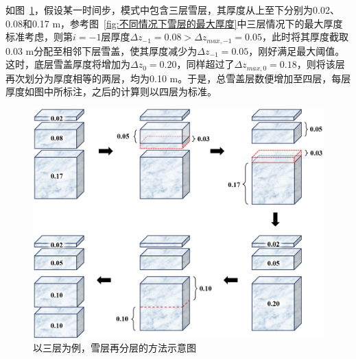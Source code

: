 如图~\ref{fig:以三层为例雪层再分层的方法}，假设某一时间步，模式中包含三层雪层，其厚度从上至下分别为0.02、0.08和0.17 m，参考图~\ref{fig:不同情况下雪层的最大厚度}中三层情况下的最大厚度标准考虑，则第$i=-1$层厚度$\Delta z_{-1}=0.08 > \Delta z_{max,-1}=0.05 $，此时将其厚度截取0.03 m分配至相邻下层雪盖，使其厚度减少为$\Delta z_{-1}=0.05$，刚好满足最大阈值。这时，底层雪盖厚度将增加为$\Delta z_{0}=0.20$，同样超过了$\Delta z_{max,0}=0.18$，则将该层再次划分为厚度相等的两层，均为0.10 m。于是，总雪盖层数便增加至四层，每层厚度如图中所标注，之后的计算则以四层为标准。

{
\begin{figure}[htbp]
\centering
\includegraphics[width=0.6\columnwidth]{Figures/雪盖土壤热力过程/以三层为例雪层再分层的方法.png}
\caption{以三层为例，雪层再分层的方法示意图}
\label{fig:以三层为例雪层再分层的方法}
\end{figure}
}


